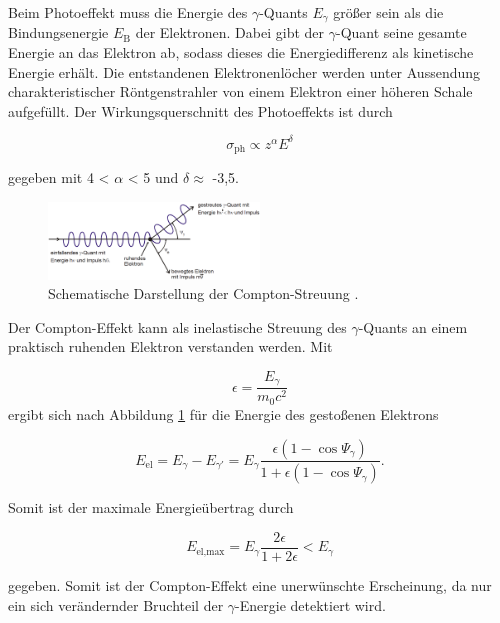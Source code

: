 Beim Photoeffekt muss die Energie des $\gamma$-Quants $E_\gamma$ größer sein als die Bindungsenergie $E_\text{B}$ der Elektronen.
Dabei gibt der $\gamma$-Quant seine gesamte Energie an das Elektron ab, sodass dieses die Energiedifferenz als kinetische Energie erhält.
Die entstandenen Elektronenlöcher werden unter Aussendung charakteristischer Röntgenstrahler von einem Elektron einer höheren Schale aufgefüllt.
Der Wirkungsquerschnitt des Photoeffekts ist durch

\begin{equation}
	\sigma_\text{ph} \propto z^\alpha E^\delta \label{photo_quer}
\end{equation}

gegeben mit 4 < $\alpha$ < 5 und $\delta \approx$ -3,5.\\

\begin{figure}
	\centering
	\includegraphics[width = 0.5\textwidth]{pic/compton.png}
	\caption{Schematische Darstellung der Compton-Streuung \cite{anleitung}.}
	\label{compton}
\end{figure}

Der Compton-Effekt kann als inelastische Streuung des $\gamma$-Quants an einem praktisch ruhenden Elektron verstanden werden.
Mit

\begin{equation}
	\epsilon = \frac{E_\gamma}{m_\text{0} c^2}
\end{equation}
ergibt sich nach Abbildung \ref{compton} für die Energie des gestoßenen Elektrons

\begin{equation}
	E_\text{el} = E_\gamma - E_{\gamma'} = E_\gamma \frac{\epsilon (1-\cos{\Psi_\gamma})}{1 + \epsilon (1-\cos{\Psi_\gamma})} . 
\end{equation}

Somit ist der maximale Energieübertrag durch 

\begin{equation}
	E_\text{el,max} = E_\gamma \frac{2\epsilon}{1+2\epsilon} < E_\gamma
\end{equation}

gegeben.
Somit ist der Compton-Effekt eine unerwünschte Erscheinung, da nur ein sich verändernder Bruchteil der $\gamma$-Energie detektiert wird.\\

